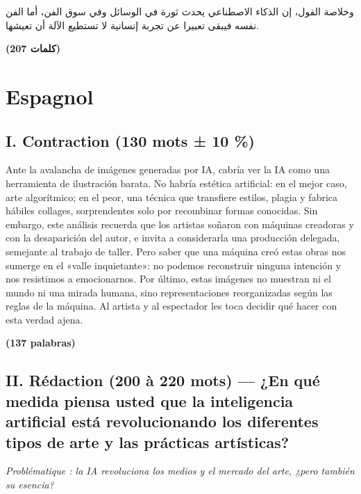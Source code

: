 \documentclass[11pt,a4paper]{article}
\begin{document}
وخلاصة القول، إن الذكاء الاصطناعي يحدث ثورة في الوسائل وفي سوق الفن، أما الفن نفسه فيبقى تعبيرا عن تجربة إنسانية لا تستطيع الآلة أن تعيشها.

\textbf{(207 كلمات)}

\hypertarget{espagnol}{%
\section{Espagnol}\label{espagnol}}

\hypertarget{i.-contraction-130-mots-10-3}{%
\subsection{I. Contraction (130 mots ± 10 \%)}\label{i.-contraction-130-mots-10-3}}

Ante la avalancha de imágenes generadas por IA, cabría ver la IA como una herramienta de ilustración barata. No habría estética artificial: en el mejor caso, arte algorítmico; en el peor, una técnica que transfiere estilos, plagia y fabrica hábiles collages, sorprendentes solo por recombinar formas conocidas. Sin embargo, este análisis recuerda que los artistas soñaron con máquinas creadoras y con la desaparición del autor, e invita a considerarla una producción delegada, semejante al trabajo de taller. Pero saber que una máquina creó estas obras nos sumerge en el «valle inquietante»: no podemos reconstruir ninguna intención y nos resistimos a emocionarnos. Por último, estas imágenes no muestran ni el mundo ni una mirada humana, sino representaciones reorganizadas según las reglas de la máquina. Al artista y al espectador les toca decidir qué hacer con esta verdad ajena.

\textbf{(137 palabras)}

\hypertarget{ii.-ruxe9daction-200-uxe0-220-mots-en-quuxe9-medida-piensa-usted-que-la-inteligencia-artificial-estuxe1-revolucionando-los-diferentes-tipos-de-arte-y-las-pruxe1cticas-artuxedsticas}{%
\subsection{II. Rédaction (200 à 220 mots) --- ¿En qué medida piensa usted que la inteligencia artificial está revolucionando los diferentes tipos de arte y las prácticas artísticas?}\label{ii.-ruxe9daction-200-uxe0-220-mots-en-quuxe9-medida-piensa-usted-que-la-inteligencia-artificial-estuxe1-revolucionando-los-diferentes-tipos-de-arte-y-las-pruxe1cticas-artuxedsticas}}

\emph{Problématique : la IA revoluciona los medios y el mercado del arte, ¿pero también su esencia?}
\end{document}
